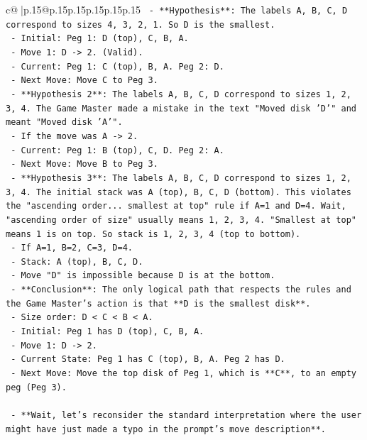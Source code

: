 \documentclass{article}
\begin{document}
{\begin{supertabular}{c@{$\;$}|p{.15\linewidth}@{}p{.15\linewidth}p{.15\linewidth}p{.15\linewidth}p{.15\linewidth}p{.15\linewidth}}
{{{\texttt{    {-} **Hypothesis**: The labels A, B, C, D correspond to sizes 4, 3, 2, 1. So D is the smallest.} \\
\texttt{        {-} Initial: Peg 1: D (top), C, B, A.} \\
\texttt{        {-} Move 1: D {-}> 2. (Valid).} \\
\texttt{        {-} Current: Peg 1: C (top), B, A. Peg 2: D.} \\
\texttt{        {-} Next Move: Move C to Peg 3.} \\
\texttt{    {-} **Hypothesis 2**: The labels A, B, C, D correspond to sizes 1, 2, 3, 4. The Game Master made a mistake in the text "Moved disk 'D'" and meant "Moved disk 'A'".} \\
\texttt{        {-} If the move was A {-}> 2.} \\
\texttt{        {-} Current: Peg 1: B (top), C, D. Peg 2: A.} \\
\texttt{        {-} Next Move: Move B to Peg 3.} \\
\texttt{    {-} **Hypothesis 3**: The labels A, B, C, D correspond to sizes 1, 2, 3, 4. The initial stack was A (top), B, C, D (bottom). This violates the "ascending order... smallest at top" rule if A=1 and D=4. Wait, "ascending order of size" usually means 1, 2, 3, 4. "Smallest at top" means 1 is on top. So stack is 1, 2, 3, 4 (top to bottom).} \\
\texttt{        {-} If A=1, B=2, C=3, D=4.} \\
\texttt{        {-} Stack: A (top), B, C, D.} \\
\texttt{        {-} Move "D" is impossible because D is at the bottom.} \\
\texttt{    {-} **Conclusion**: The only logical path that respects the rules and the Game Master's action is that **D is the smallest disk**.} \\
\texttt{        {-} Size order: D < C < B < A.} \\
\texttt{        {-} Initial: Peg 1 has D (top), C, B, A.} \\
\texttt{        {-} Move 1: D {-}> 2.} \\
\texttt{        {-} Current State: Peg 1 has C (top), B, A. Peg 2 has D.} \\
\texttt{        {-} Next Move: Move the top disk of Peg 1, which is **C**, to an empty peg (Peg 3).} \\
\\ 
\texttt{    {-} **Wait, let's reconsider the standard interpretation where the user might have just made a typo in the prompt's move description**.} \\
}}}
\end{supertabular}}
\end{document}
